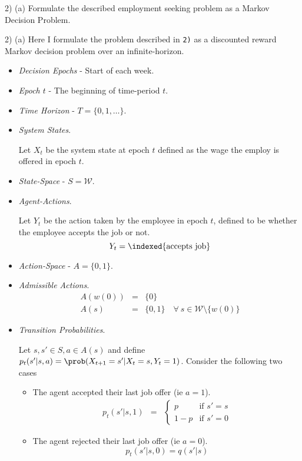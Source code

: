 \documentclass[11pt,a4paper]{article}
\begin{document}
\begin{question}{2) (a)}
  Formulate the described employment seeking problem as a Markov Decision Problem.
\end{question}

\begin{answer}{2) (a)}
  Here I formulate the problem described in \texttt{2)} as a discounted reward Markov decision problem over an infinite-horizon.
  \begin{itemize}
    \item \textit{Decision Epochs} - Start of each week.
    \item \textit{Epoch $t$} - The beginning of time-period $t$.
    \item \textit{Time Horizon} - $T=\{0,1,\dots\}$.
    \item \textit{System States}.
    \par Let $X_t$ be the system state at epoch $t$ defined as the wage the employ is offered in epoch $t$.
    \item \textit{State-Space} - $S=\mathcal{W}$.
    \item \textit{Agent-Actions}.
    \par Let $Y_t$ be the action taken by the employee in epoch $t$, defined to be whether the employee accepts the job or not.
    \[ Y_t=\indexed\{\text{accepts job}\} \]
    \item \textit{Action-Space} - $A=\{0,1\}$.
    \item \textit{Admissible Actions}.
    \[\begin{array}{rcl}
      A(w(0))&=&\{0\}\\
      A(s)&=&\{0,1\}\quad\forall\ s\in\mathcal{W}\setminus\{w(0)\}
    \end{array}\]
    \item \textit{Transition Probabilities}.
    \par Let $s,s'\in S,a\in A(s)$ and define $p_t(s'|s,a)=\prob(X_{t+1}=s'|X_t=s,Y_t=1)$. Consider the following two cases
    \begin{itemize}
      \item[\textit{Case 1}] The agent accepted their last job offer (ie $a=1$).
        \[\begin{array}{rcl}
          p_t(s'|s,1)&=&\begin{cases}
                          p  &\text{if }s'=s\\
                          1-p&\text{if }s'=0
                        \end{cases}
        \end{array}\]
      \item[\textit{Case 2}] The agent rejected their last job offer (ie $a=0$).
        \[ p_t(s'|s,0)=q(s'|s) \]
    \end{itemize}


\end{itemize}
\end{answer}
\end{document}
